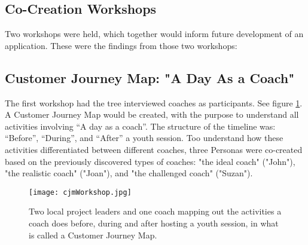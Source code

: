 \subsection{Co-Creation Workshops}


    Two workshops were held, which together would inform future development of an application. These were the findings from those two workshops:

    \subsection{Customer Journey Map: "A Day As a Coach"}

    The first workshop had the tree interviewed coaches as participants. See figure \ref{fig:cjm}. A Customer Journey Map would be created, with the purpose to understand all activities involving “A day as a coach”. The structure of the timeline was: “Before”, “During”, and “After” a youth session. Too understand how these activities differentiated between different coaches, three Personas were co-created based on the previously discovered types of coaches: "the ideal coach" ("John"), "the realistic coach" ("Joan"), and "the challenged coach" ("Suzan").

    \begin{figure}[h]
        \centering
        \texttt{[image: cjmWorkshop.jpg]}
        \caption{Two local project leaders and one coach mapping out the activities a coach does before, during and after hosting a youth session, in what is called a Customer Journey Map.}
        \label{fig:cjm}
    \end{figure}




